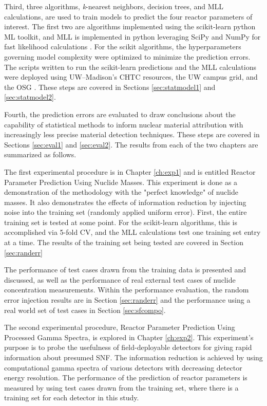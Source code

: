 Third, three algorithms, \textit{k}-nearest neighbors, decision trees, and
\gls{MLL} calculations, are used to train models to predict the four reactor
parameters of interest.  The first two are algorithms implemented using the
scikit-learn python \gls{ML} toolkit, and \gls{MLL} is implemented in python
leveraging SciPy and NumPy for fast likelihood calculations \cite{scikit,
scipy, numpy}.  For the scikit algorithms, the hyperparameters governing model
complexity were optimized to minimize the prediction errors.  The scripts
written to run the scikit-learn predictions and the \gls{MLL} calculations were
deployed using \gls{UW}--Madison's \gls{CHTC} resources, the \gls{UW} campus
grid, and the \gls{OSG} \cite{osg07, osg09}.  These steps are covered in
Sections \ref{sec:statmodel1} and \ref{sec:statmodel2}.

Fourth, the prediction errors are evaluated to draw conclusions about the
capability of statistical methods to inform nuclear material attribution with
increasingly less precise material detection techniques.  These steps are
covered in Sections \ref{sec:eval1} and \ref{sec:eval2}.  The results from each
of the two chapters are summarized as follows.

The first experimental procedure is in Chapter \ref{ch:exp1} and is entitled
Reactor Parameter Prediction Using Nuclide Masses.  This experiment is done as
a demonstration of the methodology with the "perfect knowledge" of nuclide
masses. It also demonstrates the effects of information reduction by injecting
noise into the training set (randomly applied uniform error).  First, the
entire training set is tested at some point. For the scikit-learn algorithms,
this is accomplished via 5-fold \gls{CV}, and the \gls{MLL} calculations test
one training set entry at a time. The results of the training set being tested are
covered in Section \ref{sec:randerr}


The performance of test cases drawn from the training data is presented and discussed, as well
as the performance of real external test cases of nuclide concentration
measurements.  
Within the performance evaluation, the random error injection
results are in Section \ref{sec:randerr} and the performance using a real world
set of test cases in Section \ref{sec:sfcompo}.

The second experimental procedure, Reactor Parameter Prediction Using Processed
Gamma Spectra, is explored in Chapter \ref{ch:exp2}.  This experiment's purpose
is to probe the usefulness of field-deployable detectors for giving rapid
information about presumed \gls{SNF}. The information reduction is achieved by
using computational gamma spectra of various detectors with decreasing detector
energy resolution.  The performance of the prediction of reactor parameters is
measured by using test cases drawn from the training set, where there is a
training set for each detector in this study.  

